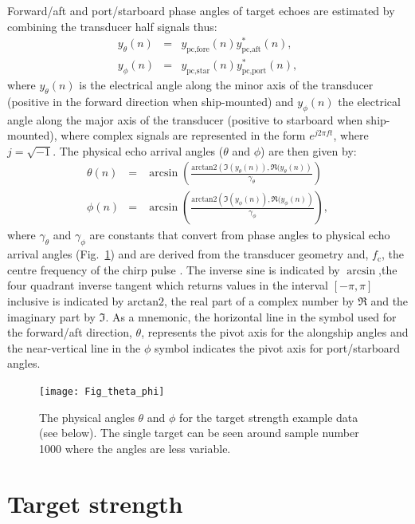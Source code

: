 \documentclass[preprint,12pt,TurnOnLineNumbers]{JASAnew}
\newcommand{\timesym}{t}
\newcommand{\freqsym}{f}
\newcommand{\samplesymt}{n}
\newcommand{\fc}{f_{\textrm{c}}}
\newcommand{\athw}{\phi}
\newcommand{\along}{\theta}
\newcommand{\atan}{\textrm{arctan2}}
\newcommand{\anglefalong}{\gamma_\along}
\newcommand{\anglefathw}{\gamma_\athw}
\begin{document}
Forward/aft and port/starboard phase angles of target echoes are estimated by combining the transducer half signals thus: 
%
\begin{eqnarray}
\label{eq:phase1}
y_\along(\samplesymt) & = & y_{\textrm{pc,fore}}(\samplesymt) y_{\textrm{pc,aft}}^*(\samplesymt), \\
y_\athw(\samplesymt) & = & y_{\textrm{pc,star}}(\samplesymt) y_{\textrm{pc,port}}^*(\samplesymt),
\end{eqnarray}
%
where $y_\along(\samplesymt)$ is the electrical angle along the minor axis of the transducer (positive in the forward direction when ship-mounted) and $y_\athw(\samplesymt)$ the electrical angle along the major axis of the transducer (positive to starboard when ship-mounted), where complex signals are represented in the form $e^{j 2\pi \freqsym \timesym}$, where $j = \sqrt{-1}$. The physical echo arrival angles ($\along$ and $\athw$) are then given by:
%
\begin{eqnarray}
\label{eq:phase2}
\along(\samplesymt) & = & \arcsin\left( \frac{\atan\left( \Im(y_\along(\samplesymt)), \Re(y_\along(\samplesymt) \right)}{\anglefalong}\right) \\
\athw(\samplesymt) & = & \arcsin\left( \frac{\atan\left( \Im(y_\athw(\samplesymt)), \Re(y_\athw(\samplesymt) \right)}{\anglefathw}\right),
\end{eqnarray}
%
where $\anglefalong$ and $\anglefathw$ are constants that convert from phase angles to physical echo arrival angles (Fig.~\ref{fi:theta_phi}) and are derived from the transducer geometry and, $\fc$, the centre frequency of the chirp pulse \citep{ehrenberg1979}. The inverse sine is indicated by $\arcsin$,the four quadrant inverse tangent which returns values in the interval $[-\pi, \pi]$ inclusive is indicated by $\atan$, the real part of a complex number by $\Re$ and the imaginary part by $\Im$. As a mnemonic, the horizontal line in the symbol used for the forward/aft direction, $\along$, represents the pivot axis for the alongship angles and the near-vertical line in the $\athw$ symbol indicates the pivot axis for port/starboard angles.
%
\begin{figure}
\texttt{[image: Fig\_theta\_phi]}
\caption{\label{fi:theta_phi}The physical angles $\along$ and $\athw$ for the target strength example data (see below). The single target can be seen around sample number 1000 where the angles are less variable.}
\end{figure}
\clearpage
\section{Target strength}
\end{document}
